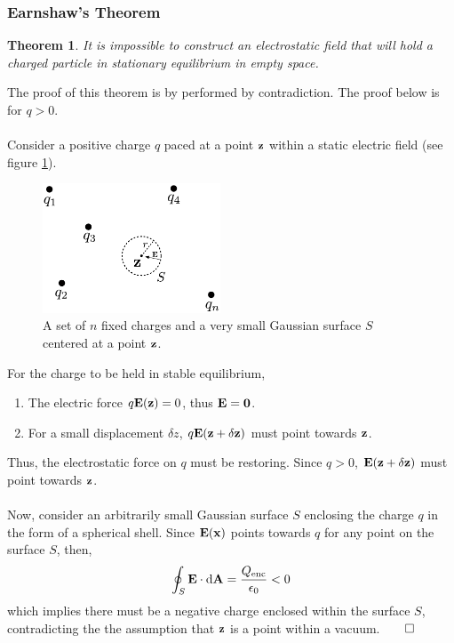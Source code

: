 \documentclass{book}
\newtheorem*{theorem}{Theorem}
\begin{document}
\subsubsection{Earnshaw's Theorem}
\begin{theorem}
    It is impossible to construct an electrostatic field that will hold a charged particle in stationary equilibrium in empty space.
\end{theorem}
The proof of this theorem is by performed by contradiction. The proof below is for $q>0$.\\\\
Consider a positive charge $q$ paced at a point $\vb{z}$ within a static electric field (see figure \ref{fig:earnshaw}).
\begin{figure}
    \centering
    \includegraphics[width=150pt]{charges-gaussian-surface.22ec9ba7.pdf}
    \caption{A set of $n$ fixed charges and a very small Gaussian surface $S$ centered at a point $\vb{z}$.}
    \label{fig:earnshaw}
\end{figure}
For the charge to be held in stable equilibrium,
\begin{enumerate}
    \item The electric force $q\vb{E}(\vb{z})=0$, thus $\vb{E}=\vb{0}$.
    \item For a small displacement $\delta z$, $q\vb{E}(\vb{z}+\delta\vb{z})$ must point towards $\vb{z}$.
\end{enumerate}
Thus, the electrostatic force on $q$ must be restoring. Since $q>0$, $\vb{E}(\vb{z}+\delta\vb{z})$ must point towards $\vb{z}$. \\\\
Now, consider an arbitrarily small Gaussian surface $S$ enclosing the charge $q$ in the form of a spherical shell. Since $\vb{E}(\vb{x})$ points towards $q$ for any point on the surface $S$, then,
\begin{equation}
    \oint_S\vb{E}\cdot\dd{\vb{A}} = \frac{Q_{\text{enc}}}{\epsilon_0} < 0
\end{equation}
which implies there must be a negative charge enclosed within the surface $S$, contradicting the the assumption that $\vb{z}$ is a point within a vacuum.$\qed$ 
\end{document}
